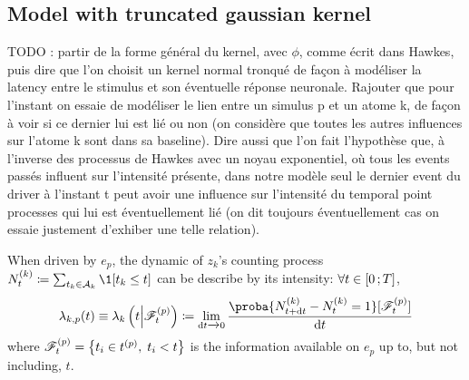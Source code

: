 \subsection{Model with truncated gaussian kernel}

TODO : partir de la forme général du kernel, avec $\phi$, comme écrit dans Hawkes, puis dire que l'on choisit un kernel normal tronqué de façon à modéliser la latency entre le stimulus et son éventuelle réponse neuronale.
Rajouter que pour l'instant on essaie de modéliser le lien entre un simulus p et un atome k, de façon à voir si ce dernier lui est lié ou non (on considère que toutes les autres influences sur l'atome k sont dans sa baseline).
Dire aussi que l'on fait l'hypothèse que, à l'inverse des processus de Hawkes avec un noyau exponentiel, où tous les events passés influent sur l'intensité présente, dans notre modèle seul le dernier event du driver à l'instant t peut avoir une influence sur l'intensité du temporal point processes qui lui est éventuellement lié (on dit toujours éventuellement cas on essaie justement d'exhiber une telle relation).

When driven by $e_p$, the dynamic of $z_k$'s counting process $N_t^{(k)} \coloneqq \sum_{t_k \in \mathcal{A}_k} \1[t_k \leq t]$ can be describe by its intensity: $\forall t\in\left[ 0 \, ; T \right]$,
\begin{equation}\label{eq:intensity_definition}
    \lambda_{k,p}(t) \equiv \lambda_{k}\pars{t \middle| \mathscr{F}_t^{(p)}} \coloneqq \lim_{\dint t \xrightarrow{} 0 }\frac{\proba{N_{t+\dint t}^{(k)} - N_t^{(k)} = 1}[\mathscr{F}_t^{(p)}]}{\dint t}
\end{equation}
where $\mathscr{F}_t^{(p)} = \left\lbrace t_i \in t^{(p)},\; t_i < t \right\rbrace$ is the information available on $e_p$ up to, but not including, $t$.

